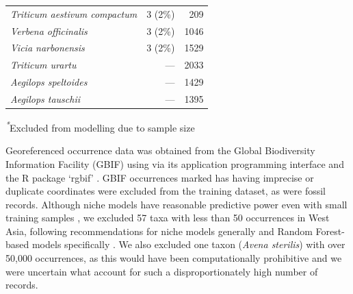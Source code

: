 \documentclass[
  authoryear,
  review]{elsarticle}
\begin{document}
\begin{table}
{\begin{tabular*}{\linewidth}{@{\extracolsep{\fill}}lrr}
\emph{Triticum aestivum compactum} & 3 (2\%) & 209 \\ 
\emph{Verbena officinalis} & 3 (2\%) & 1046 \\ 
\emph{Vicia narbonensis} & 3 (2\%) & 1529 \\ 
\emph{Triticum urartu} & — & 2033 \\ 
\emph{Aegilops speltoides} & — & 1429 \\ 
\emph{Aegilops tauschii} & — & 1395 \\ 
\bottomrule
\end{tabular*}
\begin{minipage}{\linewidth}
\textsuperscript{\textit{*}}Excluded from modelling due to sample size\\
\end{minipage}

}

\end{table}%

Georeferenced occurrence data was obtained from the Global Biodiversity
Information Facility (GBIF) using via its application programming
interface and the R package `rgbif'
\citep{ChamberlainBoettiger2017, rgbif}. GBIF occurrences marked has
having imprecise or duplicate coordinates were excluded from the
training dataset, as were fossil records. Although niche models have
reasonable predictive power even with small training samples
\citep{StockwellPeterson2002, HernandezEtAl2006, WiszEtAl2008}, we
excluded 57 taxa with less than 50 occurrences in West Asia, following
recommendations for niche models generally and Random Forest-based
models specifically \citep{StockwellPeterson2002, LuanEtAl2020}. We also
excluded one taxon (\emph{Avena sterilis}) with over 50,000 occurrences,
as this would have been computationally prohibitive and we were
uncertain what account for such a disproportionately high number of
records.
\end{document}
